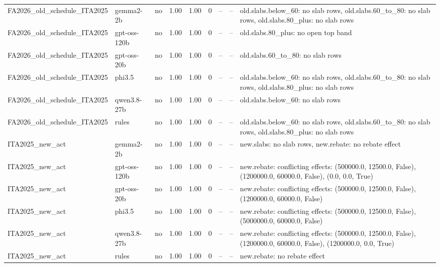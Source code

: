 \begin{table}[t]
\begin{tabular}{llcrrrrrl}
FA2026\_old\_schedule\_ITA2025 & gemma2-2b & no & 1.00 & 1.00 & 0 & -- & -- & old.slabs.below\_60: no slab rows, old.slabs.60\_to\_80: no slab rows, old.slabs.80\_plus: no slab rows \\
FA2026\_old\_schedule\_ITA2025 & gpt-oss-120b & no & 1.00 & 1.00 & 0 & -- & -- & old.slabs.80\_plus: no open top band \\
FA2026\_old\_schedule\_ITA2025 & gpt-oss-20b & no & 1.00 & 1.00 & 0 & -- & -- & old.slabs.60\_to\_80: no slab rows \\
FA2026\_old\_schedule\_ITA2025 & phi3.5 & no & 1.00 & 1.00 & 0 & -- & -- & old.slabs.below\_60: no slab rows, old.slabs.60\_to\_80: no slab rows, old.slabs.80\_plus: no slab rows \\
FA2026\_old\_schedule\_ITA2025 & qwen3.8-27b & no & 1.00 & 1.00 & 0 & -- & -- & old.slabs.below\_60: no slab rows \\
FA2026\_old\_schedule\_ITA2025 & rules & no & 1.00 & 1.00 & 0 & -- & -- & old.slabs.below\_60: no slab rows, old.slabs.60\_to\_80: no slab rows, old.slabs.80\_plus: no slab rows \\
ITA2025\_new\_act & gemma2-2b & no & 1.00 & 1.00 & 0 & -- & -- & new.slabs: no slab rows, new.rebate: no rebate effect \\
ITA2025\_new\_act & gpt-oss-120b & no & 1.00 & 1.00 & 0 & -- & -- & new.rebate: conflicting effects: (500000.0, 12500.0, False), (1200000.0, 60000.0, False), (0.0, 0.0, True) \\
ITA2025\_new\_act & gpt-oss-20b & no & 1.00 & 1.00 & 0 & -- & -- & new.rebate: conflicting effects: (500000.0, 12500.0, False), (1200000.0, 60000.0, False) \\
ITA2025\_new\_act & phi3.5 & no & 1.00 & 1.00 & 0 & -- & -- & new.rebate: conflicting effects: (500000.0, 12500.0, False), (5000000.0, 60000.0, False) \\
ITA2025\_new\_act & qwen3.8-27b & no & 1.00 & 1.00 & 0 & -- & -- & new.rebate: conflicting effects: (500000.0, 12500.0, False), (1200000.0, 60000.0, False), (1200000.0, 0.0, True) \\
ITA2025\_new\_act & rules & no & 1.00 & 1.00 & 0 & -- & -- & new.rebate: no rebate effect \\
\bottomrule
\end{tabular}
\end{table}
